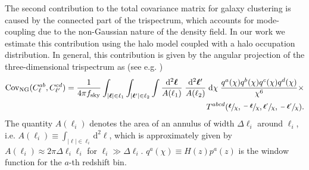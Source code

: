 \documentclass[a4paper,11pt]{article}
\begin{document}
    The second contribution to the total covariance matrix for galaxy clustering is caused by the connected part of the trispectrum, which accounts for mode-coupling due to the non-Gaussian nature of the density field. In our work we estimate this contribution using the halo model coupled with a halo occupation distribution. In general, this contribution is given by the angular projection of the three-dimensional trispectrum as (see e.g. \cite{Krause:2017})
    \begin{equation}
    \begin{aligned}
      \mathrm{Cov}_{\mathrm{NG}}(C^{ab}_{\ell}, C^{cd}_{\ell'}) = \frac{1}{4 \pi f_{\mathrm{sky}}} \int_{\vert \boldsymbol{\ell} \vert \in \ell_{1}} \int_{\vert \boldsymbol{\ell}' \vert \in \ell_{2}} \int \frac{\mathrm{d}^{2}\boldsymbol{\ell}}{A(\ell_{1})} \; \frac{\mathrm{d}^{2}\boldsymbol{\ell}'}{A(\ell_{2})} \; \mathrm{d}\chi \; \frac{q^{a}(\chi)q^{b}(\chi)q^{c}(\chi)q^{d}(\chi)}{\chi^{6}} \times \\ T^{abcd}(\sfrac{\boldsymbol{\ell}}{\chi}, \sfrac{-\boldsymbol{\ell}}{\chi}, \sfrac{\boldsymbol{\ell}'}{\chi}, \sfrac{-\boldsymbol{\ell}'}{\chi}).
    \end{aligned}
    \end{equation}
    The quantity $A(\ell_{i})$ denotes the area of an annulus of width $\Delta \ell_{i}$ around $\ell_{i}$, i.e. $A(\ell_{i}) \equiv \int_{\vert \boldsymbol{\ell} \vert \in \ell_{i}} \mathrm{d}^{2}\boldsymbol{\ell}$, which is approximately given by $A(\ell_{i}) \approx 2 \pi \Delta \ell_{i} \ell_{i}$ for $\ell_{i} \gg \Delta \ell_{i}$. $q^a(\chi)\equiv H(z)p^a(z)$ is the window function for the $a$-th redshift bin.
    
\end{document}
